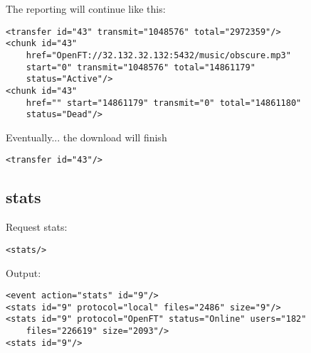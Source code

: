 \documentclass[10pt]{article}
\begin{document}
The reporting will continue like this:
\begin{verbatim}
<transfer id="43" transmit="1048576" total="2972359"/>
<chunk id="43"
    href="OpenFT://32.132.32.132:5432/music/obscure.mp3"
    start="0" transmit="1048576" total="14861179"
    status="Active"/>
<chunk id="43"
    href="" start="14861179" transmit="0" total="14861180"
    status="Dead"/>
\end{verbatim}

Eventually... the download will finish
\begin{verbatim}
<transfer id="43"/> 
\end{verbatim}

\subsection{stats}
Request stats:
\begin{verbatim}
<stats/>
\end{verbatim}

Output:
\begin{verbatim}
<event action="stats" id="9"/>
<stats id="9" protocol="local" files="2486" size="9"/>
<stats id="9" protocol="OpenFT" status="Online" users="182"
    files="226619" size="2093"/>
<stats id="9"/>
\end{verbatim}
\end{document}
